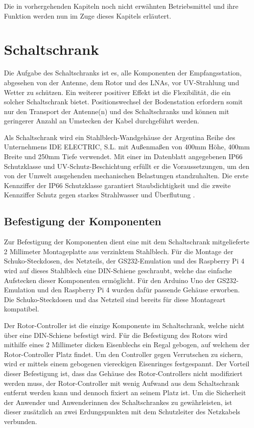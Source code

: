 Die in vorhergehenden Kapiteln noch nicht erwähnten Betriebsmittel und ihre Funktion werden nun im Zuge dieses Kapitels erläutert. 

\section{Schaltschrank}
\label{sec:Schaltschrank}
Die Aufgabe des Schaltschranks ist es, alle Komponenten der Empfangsstation, abgesehen von der Antenne, dem Rotor und des LNAs, vor UV-Strahlung und Wetter zu schützen. Ein weiterer positiver Effekt ist die Flexibilität, die ein solcher Schaltschrank bietet. Positionswechsel der Bodenstation erfordern somit nur den Transport der Antenne(n) und des Schaltschranks und können mit geringerer Anzahl an Umstecken der Kabel durchgeführt werden.

Als Schaltschrank wird ein Stahlblech-Wandgehäuse der Argentina Reihe des Unternehmens IDE ELECTRIC, S.L. mit Außenmaßen von 400mm Höhe, 400mm Breite und 250mm Tiefe verwendet. Mit einer im Datenblatt \cite{ide_electric_sl_datenblatt_nodate} angegebenen IP66 Schutzklasse und UV-Schutz-Beschichtung erfüllt er die Voraussetzungen, um den von der Umwelt ausgehenden mechanischen Belastungen standzuhalten. Die erste Kennziffer der IP66 Schutzklasse garantiert Staubdichtigkeit und die zweite Kennziffer Schutz gegen starkes Strahlwasser und Überflutung \cite[p. 53]{lienig_elektronische_2014}.

\subsection{Befestigung der Komponenten}
Zur Befestigung der Komponenten dient eine mit dem Schaltschrank mitgelieferte 2 Millimeter Montageplatte aus verzinktem Stahlblech. Für die Montage der Schuko-Steckdosen, des Netzteils, der GS232-Emulation und des Raspberry Pi 4 wird auf dieses Stahlblech eine DIN-Schiene geschraubt, welche das einfache Aufstecken dieser Komponenten ermöglicht. Für den Arduino Uno der GS232-Emulation und den Raspberry Pi 4 wurden dafür passende Gehäuse erworben. Die Schuko-Steckdosen und das Netzteil sind bereits für diese Montageart kompatibel. 

Der Rotor-Controller ist die einzige Komponente im Schaltschrank, welche nicht über eine DIN-Schiene befestigt wird. Für die Befestigung des Rotors wird mithilfe eines 2 Millimeter dicken Eisenblechs ein Regal gebogen, auf welchem der Rotor-Controller Platz findet. Um den Controller gegen Verrutschen zu sichern, wird er mittels einem gebogenen viereckigen Eisenringes festgespannt. Der Vorteil dieser Befestigung ist, dass das Gehäuse des Rotor-Controllers nicht modifiziert werden muss, der Rotor-Controller mit wenig Aufwand aus dem Schaltschrank entfernt werden kann und dennoch fixiert an seinem Platz ist. Um die Sicherheit der Anwender und Anwenderinnen des Schaltschrankes zu gewährleisten, ist dieser zusätzlich an zwei Erdungspunkten mit dem Schutzleiter des Netzkabels verbunden.

